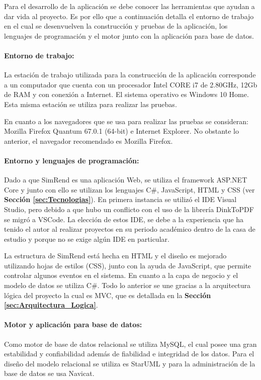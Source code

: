 Para el desarrollo de la aplicación se debe conocer las herramientas que ayudan a dar vida al proyecto. Es por ello que a continuación detalla el entorno de trabajo en el cual se desenvuelven la construcción y pruebas de la aplicación, los lenguajes de programación y el motor junto con la aplicación para base de datos.

\paragraph{Entorno de trabajo: } La estación de trabajo utilizada para la construcción de la aplicación corresponde a un computador que cuenta con un procesador Intel CORE i7 de 2.80GHz, 12Gb de RAM y con conexión a Internet. El sistema operativo es Windows 10 Home. Esta misma estación se utiliza para realizar las pruebas.

En cuanto a los navegadores que se usa para realizar las pruebas se consideran: Mozilla Firefox Quantum 67.0.1 (64-bit) e Internet Explorer. No obstante lo anterior, el navegador recomendado es Mozilla Firefox.

\paragraph{Entorno y lenguajes de programación: } Dado a que SimRend es una aplicación Web, se utiliza el framework ASP.NET Core y junto con ello se utilizan los lenguajes C\#, JavaScript, HTML y CSS (ver \textbf{Sección \ref{sec:Tecnologias}}). En primera instancia se utilizó el IDE Visual Studio, pero debido a que hubo un conflicto con el uso de la librería DinkToPDF se migró a VSCode. La elección de estos IDE, se debe a la experiencia que ha tenido el autor al realizar proyectos en su periodo académico dentro de la casa de estudio y porque no se exige algún IDE en particular.

La estructura de SimRend está hecha en HTML y el diseño es mejorado utilizando hojas de estilos (CSS), junto con la ayuda de JavaScript, que permite controlar algunos eventos en el sistema. En cuanto a la capa de negocio y el modelo de datos se utiliza C\#. Todo lo anterior se une gracias a la arquitectura lógica del proyecto la cual es MVC, que es detallada en la \textbf{Sección \ref{sec:Arquitectura_Logica}}.

\paragraph{Motor y aplicación para base de datos: } Como motor de base de datos relacional se utiliza MySQL, el cual posee una gran estabilidad y confiabilidad además de fiabilidad e integridad de los datos. Para el diseño del modelo relacional se utiliza es StarUML y para la administración de la base de datos se usa Navicat.

